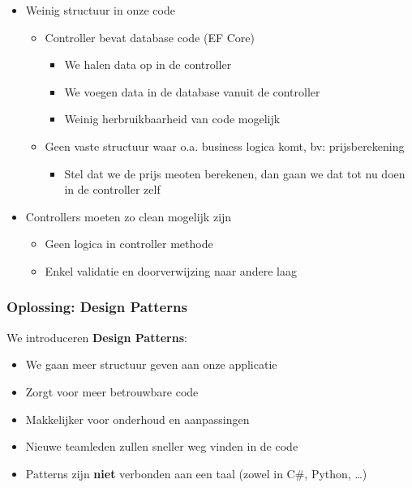 \documentclass{article}
\begin{document}
\begin{itemize}
    \item Weinig structuur in onze code
    \begin{itemize}
        \item Controller bevat database code (EF Core)
        \begin{itemize}
            \item We halen data op in de controller
            \item We voegen data in de database vanuit de controller
            \item Weinig herbruikbaarheid van code mogelijk
        \end{itemize}
        \item Geen vaste structuur waar o.a. business logica komt, bv: prijsberekening
        \begin{itemize}
            \item Stel dat we de prijs meoten berekenen, dan gaan we dat tot nu doen in de controller zelf
        \end{itemize}
    \end{itemize}
    \item Controllers moeten zo clean mogelijk zijn
    \begin{itemize}
        \item Geen logica in controller methode
        \item Enkel validatie en doorverwijzing naar andere laag
    \end{itemize}
\end{itemize}

\subsubsection{Oplossing: Design Patterns}

We introduceren \textbf{Design Patterns}:

\begin{itemize}
    \item We gaan meer structuur geven aan onze applicatie
    \item Zorgt voor meer betrouwbare code
    \item Makkelijker voor onderhoud en aanpassingen
    \item Nieuwe teamleden zullen sneller weg vinden in de code
    \item Patterns zijn \textbf{niet} verbonden aan een taal (zowel in C\#, Python, \dots)
\end{itemize}
\end{document}
